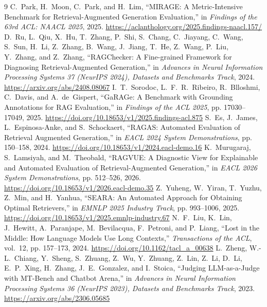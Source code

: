 \documentclass[conference]{IEEEtran}
\begin{document}
\begin{thebibliography}{9}
C.~Park, H.~Moon, C.~Park, and H.~Lim, ``MIRAGE: A Metric-Intensive Benchmark
for Retrieval-Augmented Generation Evaluation,'' in \emph{Findings of the
63rd ACL: NAACL 2025}, 2025. \url{https://aclanthology.org/2025.findings-naacl.157/}
D.~Ru, L.~Qiu, X.~Hu, T.~Zhang, P.~Shi, S.~Chang, C.~Jiayang, C.~Wang,
S.~Sun, H.~Li, Z.~Zhang, B.~Wang, J.~Jiang, T.~He, Z.~Wang, P.~Liu,
Y.~Zhang, and Z.~Zhang, ``RAGChecker: A Fine-grained Framework for
Diagnosing Retrieval-Augmented Generation,'' in \emph{Advances in Neural
Information Processing Systems 37 (NeurIPS 2024), Datasets and Benchmarks
Track}, 2024. \url{https://arxiv.org/abs/2408.08067}
I.~T.~Sorodoc, L.~F.~R.~Ribeiro, R.~Blloshmi, C.~Davis, and A.~de~Gispert,
``GaRAGe: A Benchmark with Grounding Annotations for RAG Evaluation,'' in
\emph{Findings of the ACL 2025}, pp. 17030--17049, 2025.
\url{https://doi.org/10.18653/v1/2025.findings-acl.875}
S.~Es, J.~James, L.~Espinosa-Anke, and S.~Schockaert, ``RAGAS: Automated
Evaluation of Retrieval Augmented Generation,'' in \emph{EACL 2024 System
Demonstrations}, pp. 150--158, 2024.
\url{https://doi.org/10.18653/v1/2024.eacl-demo.16}
K.~Murugaraj, S.~Lamsiyah, and M.~Theobald, ``RAGVUE: A Diagnostic View for
Explainable and Automated Evaluation of Retrieval-Augmented Generation,'' in
\emph{EACL 2026 System Demonstrations}, pp. 512--526, 2026.
\url{https://doi.org/10.18653/v1/2026.eacl-demo.35}
Z.~Yuheng, W.~Yiran, T.~Yuzhu, Z.~Min, and H.~Yanhua, ``SEARA: An Automated
Approach for Obtaining Optimal Retrievers,'' in \emph{EMNLP 2025 Industry
Track}, pp. 993--1006, 2025.
\url{https://doi.org/10.18653/v1/2025.emnlp-industry.67}
N.~F.~Liu, K.~Lin, J.~Hewitt, A.~Paranjape, M.~Bevilacqua, F.~Petroni, and
P.~Liang, ``Lost in the Middle: How Language Models Use Long Contexts,''
\emph{Transactions of the ACL}, vol.~12, pp. 157--173, 2024.
\url{https://doi.org/10.1162/tacl_a_00638}
L.~Zheng, W.-L.~Chiang, Y.~Sheng, S.~Zhuang, Z.~Wu, Y.~Zhuang, Z.~Lin,
Z.~Li, D.~Li, E.~P.~Xing, H.~Zhang, J.~E.~Gonzalez, and I.~Stoica,
``Judging LLM-as-a-Judge with MT-Bench and Chatbot Arena,'' in \emph{Advances
in Neural Information Processing Systems 36 (NeurIPS 2023), Datasets and
Benchmarks Track}, 2023. \url{https://arxiv.org/abs/2306.05685}
\end{thebibliography}
\end{document}

